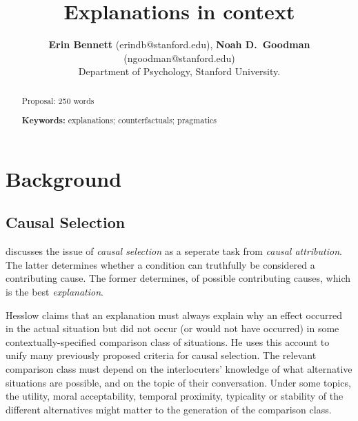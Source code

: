 \documentclass[10pt,letterpaper]{article}
\title{Explanations in context}
\author{{\large \bf Erin Bennett} (erindb@stanford.edu), {\large \bf Noah D.~Goodman} (ngoodman@stanford.edu)\\
  Department of Psychology, Stanford University.}
\begin{document}
\maketitle

\begin{abstract}

Proposal: 250 words

\textbf{Keywords:} 
explanations; counterfactuals; pragmatics
\end{abstract}

\section{Background}

\subsection{Causal Selection}

 discusses the issue of \emph{causal selection} as a seperate task from \emph{causal attribution}.
The latter determines whether a condition can truthfully be considered a contributing cause.
The former determines, of possible contributing causes, which is the best \emph{explanation}.

Hesslow claims that an explanation must always explain why an effect occurred in the actual situation but did not occur (or would not have occurred) in some contextually-specified comparison class of situations.
He uses this account to unify many previously proposed criteria for causal selection. %
The relevant comparison class must depend on the interlocuters' knowledge of what alternative situations are possible, and on the topic of their conversation.
Under some topics, the utility, moral acceptability, temporal proximity, typicality or stability of the different alternatives might matter to the generation of the comparison class.



\setlength{\bibleftmargin}{.125in}
\setlength{\bibindent}{-\bibleftmargin}


\end{document}
